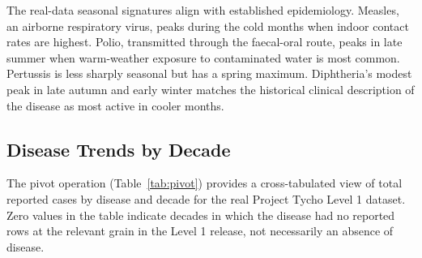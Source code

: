 \documentclass[12pt,a4paper]{article}
\begin{document}
The real-data seasonal signatures align with established epidemiology. Measles, an airborne respiratory virus, peaks during the cold months when indoor contact rates are highest. Polio, transmitted through the faecal-oral route, peaks in late summer when warm-weather exposure to contaminated water is most common. Pertussis is less sharply seasonal but has a spring maximum. Diphtheria's modest peak in late autumn and early winter matches the historical clinical description of the disease as most active in cooler months.

\subsection{Disease Trends by Decade}

The pivot operation (Table~\ref{tab:pivot}) provides a cross-tabulated view of total reported cases by disease and decade for the real Project Tycho Level 1 dataset. Zero values in the table indicate decades in which the disease had no reported rows at the relevant grain in the Level 1 release, not necessarily an absence of disease.
\end{document}

